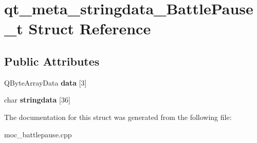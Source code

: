 \hypertarget{structqt__meta__stringdata___battle_pause__t}{\section{qt\-\_\-meta\-\_\-stringdata\-\_\-\-Battle\-Pause\-\_\-t Struct Reference}
\label{structqt__meta__stringdata___battle_pause__t}
}
\subsection*{Public Attributes}
\begin{DoxyCompactItemize}
\item 
\hypertarget{structqt__meta__stringdata___battle_pause__t_aca48ea4e086c761c58a0ff64de16ebef}{Q\-Byte\-Array\-Data {\bfseries data} \mbox{[}3\mbox{]}}\label{structqt__meta__stringdata___battle_pause__t_aca48ea4e086c761c58a0ff64de16ebef}

\item 
\hypertarget{structqt__meta__stringdata___battle_pause__t_a9db2cc35cd32f230a8536f6394012e16}{char {\bfseries stringdata} \mbox{[}36\mbox{]}}\label{structqt__meta__stringdata___battle_pause__t_a9db2cc35cd32f230a8536f6394012e16}

\end{DoxyCompactItemize}


The documentation for this struct was generated from the following file\-:\begin{DoxyCompactItemize}
\item 
moc\-\_\-battlepause.\-cpp\end{DoxyCompactItemize}
